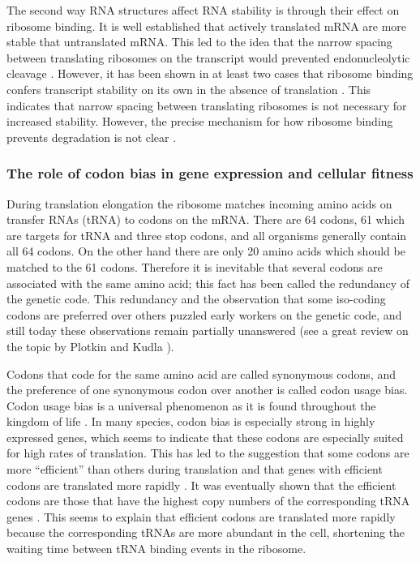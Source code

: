 The second way RNA structures affect RNA stability is through their effect on
ribosome binding. It is well established that actively translated mRNA are more
stable that untranslated mRNA. This led to the idea that the narrow spacing
between translating ribosomes on the transcript would prevented endonucleolytic
cleavage \cite{deana_lost_2005}. However, it has been shown in at least two
cases that ribosome binding confers transcript stability on its own in the
absence of translation \cite{wagner_efficient_1994, hambraeus_5_2002}. This
indicates that narrow spacing between translating ribosomes is not necessary
for increased stability. However, the precise mechanism for how ribosome
binding prevents degradation is not clear \cite{deana_lost_2005}.

\subsubsection{The role of codon bias in gene expression and cellular fitness}
During translation elongation the ribosome matches incoming amino acids on
transfer RNAs (tRNA) to codons on the mRNA. There are 64 codons, 61 which are
targets for tRNA and three stop codons, and all organisms generally contain all
64 codons. On the other hand there are only 20 amino acids which should be
matched to the 61 codons. Therefore it is inevitable that several codons are
associated with the same amino acid; this fact has been called the redundancy
of the genetic code. This redundancy and the observation that some iso-coding
codons are preferred over others puzzled early workers on the genetic code,
and still today these observations remain partially unanswered (see a great
review on the topic by Plotkin and Kudla \cite{plotkin_synonymous_2011}).

Codons that code for the same amino acid are called synonymous codons, and the
preference of one synonymous codon over another is called codon usage bias.
Codon usage bias is a universal phenomenon as it is found throughout the
kingdom of life \cite{sharp_codon_1988}. In many species, codon bias is
especially strong in highly expressed genes, which seems to indicate that these
codons are especially suited for high rates of translation. This has led to
the suggestion that some codons are more ``efficient'' than others during
translation and that genes with efficient codons are translated more
rapidly \cite{moriyama_gene_1998}. It was eventually shown that the efficient
codons are those that have the highest copy numbers of the corresponding tRNA
genes \cite{reis_solving_2004, elf_selective_2003}. This seems to explain that
efficient codons are translated more rapidly because the corresponding tRNAs
are more abundant in the cell, shortening the waiting time between tRNA binding
events in the ribosome.

